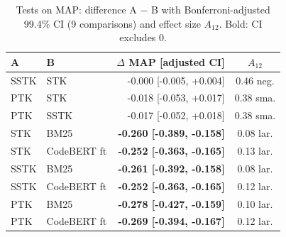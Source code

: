 \begin{table}[!htbp]
\centering
\caption{Tests on MAP: difference A $-$ B with Bonferroni-adjusted 99.4\% CI (9 comparisons) and effect size $A_{12}$. Bold: CI excludes 0.}
\label{tab:rq2effects}
\footnotesize
\setlength{\tabcolsep}{4pt}
\begin{tabular}{llrc}
\toprule
A & B & $\Delta$ MAP [adjusted CI] & $A_{12}$ \\
\midrule
SSTK & STK & -0.000 [-0.005, +0.004] & 0.46 neg. \\
PTK & STK & -0.018 [-0.053, +0.017] & 0.38 sma. \\
PTK & SSTK & -0.017 [-0.052, +0.018] & 0.38 sma. \\
STK & BM25 & \textbf{-0.260 [-0.389, -0.158]} & 0.08 lar. \\
STK & CodeBERT ft & \textbf{-0.252 [-0.363, -0.165]} & 0.13 lar. \\
SSTK & BM25 & \textbf{-0.261 [-0.392, -0.158]} & 0.08 lar. \\
SSTK & CodeBERT ft & \textbf{-0.252 [-0.363, -0.165]} & 0.12 lar. \\
PTK & BM25 & \textbf{-0.278 [-0.427, -0.159]} & 0.10 lar. \\
PTK & CodeBERT ft & \textbf{-0.269 [-0.394, -0.167]} & 0.12 lar. \\
\bottomrule
\end{tabular}
\end{table}
